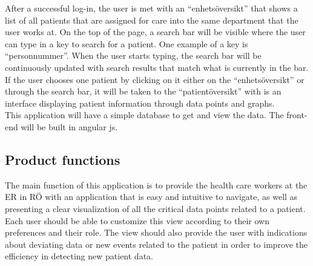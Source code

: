 After a successful log-in, the user is met with an “enhetsöversikt” that shows a list of all patients that are assigned for care into the same department that the user works at. On the top of the page, a search bar will be visible where the user can type in a key to search for a patient. One example of a key is “personnummer”. When the user starts typing, the search bar will be continuously updated with search results that match what is currently in the bar. If the user chooses one patient by clicking on it either on the “enhetsöversikt” or through the search bar, it will be taken to the “patientöversikt” with is an interface displaying patient information through data points and graphs.
\\
This application will have a simple database to get and view the data. The front-end will be built in angular js. 

\subsection{Product functions}
The main function of this application is to provide the health care workers at the ER in RÖ with an application that is easy and intuitive to navigate, as well as presenting a clear visualization of all the critical data points related to a patient. Each user should be able to customize this view according to their own preferences and their role. The view should also provide the user with indications about deviating data or new events related to the patient in order to improve the efficiency in detecting new patient data.

